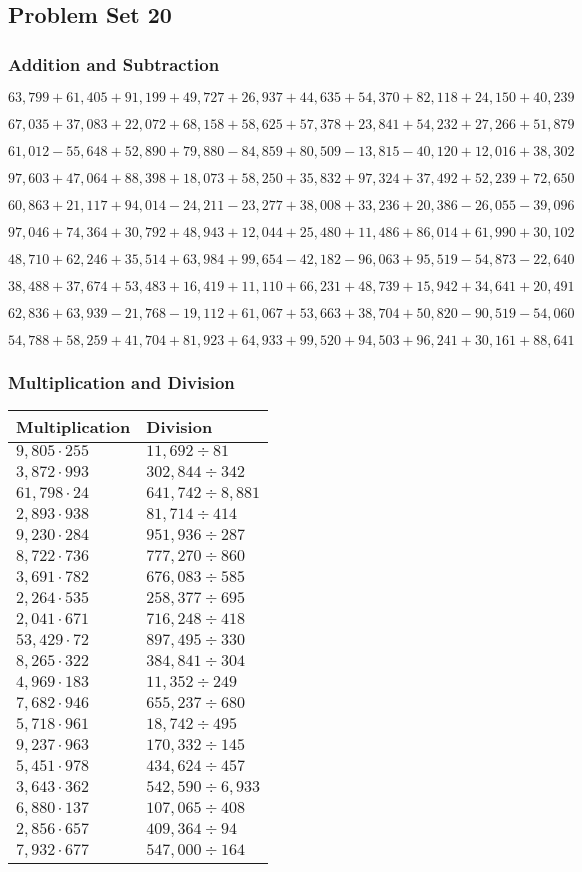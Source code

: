 \hypertarget{problem-set-20-4}{%
\subsection{Problem Set 20}\label{problem-set-20-4}}

\hypertarget{addition-and-subtraction-242}{%
\subsubsection{Addition and
Subtraction}\label{addition-and-subtraction-242}}

\(63,799+61,405+91,199+49,727+26,937+44,635+54,370+82,118+24,150+ 40,239\)

\(67,035+37,083+22,072+68,158+58,625+57,378+23,841+54,232+27,266+51,879\)

\(61,012-55,648+52,890+79,880-84,859+80,509-13,815-40,120+12,016+38,302\)

\(97,603+47,064+88,398+18,073+58,250+35,832+97,324+37,492+52,239+72,650\)

\(60,863+21,117+94,014-24,211-23,277+38,008+33,236+20,386-26,055-39,096\)

\(97,046+74,364+30,792+48,943+12,044+25,480+11,486+86,014+61,990+30,102\)

\(48,710+62,246+35,514+63,984+99,654-42,182-96,063+95,519-54,873-22,640\)

\(38,488+37,674+53,483+16,419+11,110+66,231+48,739+15,942+34,641+20,491\)

\(62,836+63,939-21,768-19,112+61,067+53,663+38,704+50,820-90,519-54,060\)

\(54,788+58,259+41,704+81,923+64,933+99,520+94,503+96,241+30,161+88,641\)

\hypertarget{multiplication-and-division-241}{%
\subsubsection{Multiplication and
Division}\label{multiplication-and-division-241}}

\begin{longtable}[]{@{}ll@{}}
\toprule
Multiplication & Division\tabularnewline
\midrule
\endhead
\(9,805\cdot255\) & \(11,692÷81\)\tabularnewline
\(3,872\cdot993\) & \(302,844÷342\)\tabularnewline
\(61,798\cdot24\) & \(641,742÷8,881\)\tabularnewline
\(2,893\cdot938\) & \(81,714÷414\)\tabularnewline
\(9,230\cdot284\) & \(951,936÷287\)\tabularnewline
\(8,722\cdot736\) & \(777,270÷860\)\tabularnewline
\(3,691\cdot782\) & \(676,083÷585\)\tabularnewline
\(2,264\cdot535\) & \(258,377÷695\)\tabularnewline
\(2,041\cdot671\) & \(716,248÷418\)\tabularnewline
\(53,429\cdot72\) & \(897,495÷330\)\tabularnewline
\(8,265\cdot322\) & \(384,841÷304\)\tabularnewline
\(4,969\cdot183\) & \(11,352÷249\)\tabularnewline
\(7,682\cdot946\) & \(655,237÷680\)\tabularnewline
\(5,718\cdot961\) & \(18,742÷495\)\tabularnewline
\(9,237\cdot963\) & \(170,332÷145\)\tabularnewline
\(5,451\cdot978\) & \(434,624÷457\)\tabularnewline
\(3,643\cdot362\) & \(542,590÷6,933\)\tabularnewline
\(6,880\cdot137\) & \(107,065÷408\)\tabularnewline
\(2,856\cdot657\) & \(409,364÷94\)\tabularnewline
\(7,932\cdot677\) & \(547,000÷164\)\tabularnewline
\bottomrule
\end{longtable}

